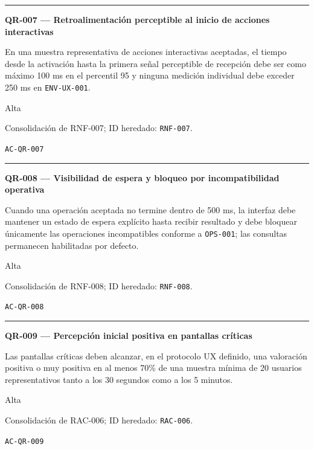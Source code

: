 \documentclass[10pt,letterpaper]{article}
\begin{document}
\vspace{0.25em}\hrule\vspace{0.65em}
\noindent\textbf{QR-007 --- Retroalimentación perceptible al inicio de acciones interactivas}\par
\begin{description}[style=nextline,leftmargin=3.15cm,labelwidth=2.8cm,font=\normalfont\bfseries]
\item[Obligación] En una muestra representativa de acciones interactivas aceptadas, el tiempo desde la activación hasta la primera señal perceptible de recepción debe ser como máximo 100 ms en el percentil 95 y ninguna medición individual debe exceder 250 ms en \texttt{ENV-UX-001}.
\item[Prioridad] Alta
\item[Procedencia] Consolidación de RNF-007; ID heredado: \texttt{RNF-007}.
\item[Verificación] \texttt{AC-QR-007}
\end{description}
\vspace{0.25em}\hrule\vspace{0.65em}
\noindent\textbf{QR-008 --- Visibilidad de espera y bloqueo por incompatibilidad operativa}\par
\begin{description}[style=nextline,leftmargin=3.15cm,labelwidth=2.8cm,font=\normalfont\bfseries]
\item[Obligación] Cuando una operación aceptada no termine dentro de 500 ms, la interfaz debe mantener un estado de espera explícito hasta recibir resultado y debe bloquear únicamente las operaciones incompatibles conforme a \texttt{OPS-001}; las consultas permanecen habilitadas por defecto.
\item[Prioridad] Alta
\item[Procedencia] Consolidación de RNF-008; ID heredado: \texttt{RNF-008}.
\item[Verificación] \texttt{AC-QR-008}
\end{description}
\vspace{0.25em}\hrule\vspace{0.65em}
\noindent\textbf{QR-009 --- Percepción inicial positiva en pantallas críticas}\par
\begin{description}[style=nextline,leftmargin=3.15cm,labelwidth=2.8cm,font=\normalfont\bfseries]
\item[Obligación] Las pantallas críticas deben alcanzar, en el protocolo UX definido, una valoración positiva o muy positiva en al menos 70\% de una muestra mínima de 20 usuarios representativos tanto a los 30 segundos como a los 5 minutos.
\item[Prioridad] Alta
\item[Procedencia] Consolidación de RAC-006; ID heredado: \texttt{RAC-006}.
\item[Verificación] \texttt{AC-QR-009}
\end{description}
\end{document}
